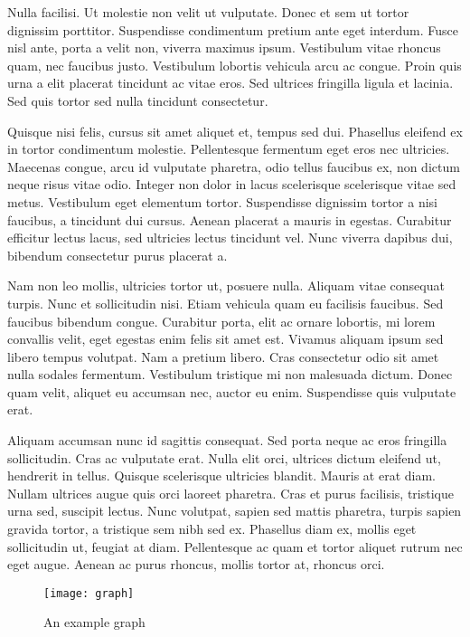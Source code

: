 Nulla facilisi. Ut molestie non velit ut vulputate. Donec et sem ut tortor dignissim porttitor. Suspendisse condimentum pretium ante eget interdum. Fusce nisl ante, porta a velit non, viverra maximus ipsum. Vestibulum vitae rhoncus quam, nec faucibus justo. Vestibulum lobortis vehicula arcu ac congue. Proin quis urna a elit placerat tincidunt ac vitae eros. Sed ultrices fringilla ligula et lacinia. Sed quis tortor sed nulla tincidunt consectetur.

Quisque nisi felis, cursus sit amet aliquet et, tempus sed dui. Phasellus eleifend ex in tortor condimentum molestie. Pellentesque fermentum eget eros nec ultricies. Maecenas congue, arcu id vulputate pharetra, odio tellus faucibus ex, non dictum neque risus vitae odio. Integer non dolor in lacus scelerisque scelerisque vitae sed metus. Vestibulum eget elementum tortor. Suspendisse dignissim tortor a nisi faucibus, a tincidunt dui cursus. Aenean placerat a mauris in egestas. Curabitur efficitur lectus lacus, sed ultricies lectus tincidunt vel. Nunc viverra dapibus dui, bibendum consectetur purus placerat a.

Nam non leo mollis, ultricies tortor ut, posuere nulla. Aliquam vitae consequat turpis. Nunc et sollicitudin nisi. Etiam vehicula quam eu facilisis faucibus. Sed faucibus bibendum congue. Curabitur porta, elit ac ornare lobortis, mi lorem convallis velit, eget egestas enim felis sit amet est. Vivamus aliquam ipsum sed libero tempus volutpat. Nam a pretium libero. Cras consectetur odio sit amet nulla sodales fermentum. Vestibulum tristique mi non malesuada dictum. Donec quam velit, aliquet eu accumsan nec, auctor eu enim. Suspendisse quis vulputate erat.

Aliquam accumsan nunc id sagittis consequat. Sed porta neque ac eros fringilla sollicitudin. Cras ac vulputate erat. Nulla elit orci, ultrices dictum eleifend ut, hendrerit in tellus. Quisque scelerisque ultricies blandit. Mauris at erat diam. Nullam ultrices augue quis orci laoreet pharetra. Cras et purus facilisis, tristique urna sed, suscipit lectus. Nunc volutpat, sapien sed mattis pharetra, turpis sapien gravida tortor, a tristique sem nibh sed ex. Phasellus diam ex, mollis eget sollicitudin ut, feugiat at diam. Pellentesque ac quam et tortor aliquet rutrum nec eget augue. Aenean ac purus rhoncus, mollis tortor at, rhoncus orci.

\begin{figure}[h]
\centering
\texttt{[image: graph]}
\caption{An example graph}
\label{fig:x sine graph}
\end{figure}

